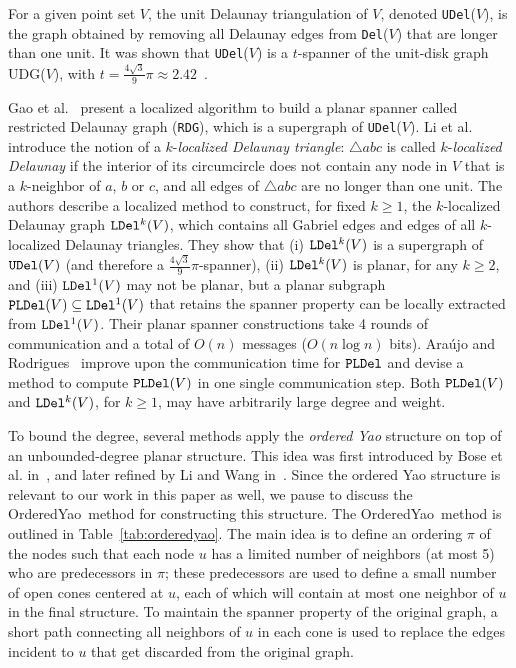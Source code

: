 \documentclass{llncs}
\newcommand{\udel}{{\tt UDel}}
\newcommand{\ldel}{{\tt LDel}}
\newcommand{\pldel}{{\tt PLDel}}
\newcommand{\del}{{\tt Del}}
\newcommand{\oyao}{{\sc OrderedYao}}
\begin{document}
For a given point set $V$, the unit Delaunay triangulation of $V$, denoted \udel($V$),
is the graph obtained by removing all Delaunay edges from \del($V$) that are
longer than one unit.
It was shown that \udel($V$) is a $t$-spanner of the unit-disk graph
UDG($V$), with $t = \frac{4\sqrt{3}}{9}\pi \approx 2.42$~\cite{LCW02}.

Gao et al.~\cite{GGH+01} present a localized algorithm to build a
planar spanner called restricted Delaunay graph ({\tt RDG}), which is a
supergraph of \udel($V$).
Li et al.~\cite{LCW02} introduce the notion of a
$k$-\emph{localized Delaunay triangle}: $\triangle abc$ is called
$k$-\emph{localized Delaunay} if the interior of its circumcircle does not
contain any node in $V$ that is a $k$-neighbor of $a$, $b$ or $c$,
and all edges of $\triangle abc$ are no longer than
one unit. The authors describe a localized method to construct, for
fixed $k \ge 1$, the $k$-localized Delaunay graph $\ldel^k(V)$, which
contains all Gabriel edges and edges of all $k$-localized
Delaunay triangles. They show that (i) $\ldel^k(V)$ is a supergraph
of $\udel(V)$ (and therefore a $\frac{4\sqrt{3}}{9}\pi$-spanner), (ii)
$\ldel^k(V)$ is planar, for any $k \ge 2$, and (iii) $\ldel^1(V)$ may
not be planar, but a planar subgraph $\pldel(V) \subseteq  \ldel^1(V)$ that
retains the spanner property can be locally extracted from $\ldel^1(V)$.
Their planar spanner constructions take 4 rounds of communication and a
total of $O(n)$ messages ($O(n \log n)$ bits).
Ara{\'u}jo and Rodrigues~\cite{AraujoR04} improve upon the communication
time for $\pldel$ and devise a method to compute $\pldel(V)$ in one
single communication step. Both $\pldel(V)$ and $\ldel^k(V)$, for $k \ge 1$,
may have arbitrarily large degree and weight.

To bound the degree, several methods apply the \emph{ordered Yao} structure
on top of an unbounded-degree planar structure. This idea was first introduced by
Bose et al. in~\cite{BGMS02},
and later refined by Li and Wang in~\cite{WangLi03,LiWang04}. Since the
ordered Yao structure is relevant to our work in this paper as well,
we pause to discuss the \oyao\ method for constructing this structure.
The \oyao\ method is outlined in Table~\ref{tab:orderedyao}. The main idea
is to define an ordering $\pi$ of the nodes such that each node $u$ has
a limited number of neighbors (at most 5) who are predecessors in $\pi$;
these predecessors are used to define a small number of open cones
centered at $u$, each of which will contain at most one neighbor of $u$
in the final structure. To maintain the spanner property of the original graph,
a short path connecting all neighbors of $u$ in each cone is used
to replace the edges incident to $u$ that get discarded from the original graph.
\end{document}
